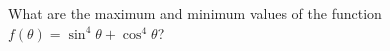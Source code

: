
%
%
%
%
% 
% 

\question[3] What are the maximum and minimum values of the function $f(\theta) = \sin^4\theta + \cos^4\theta$?


\ifprintanswers
\fi 

